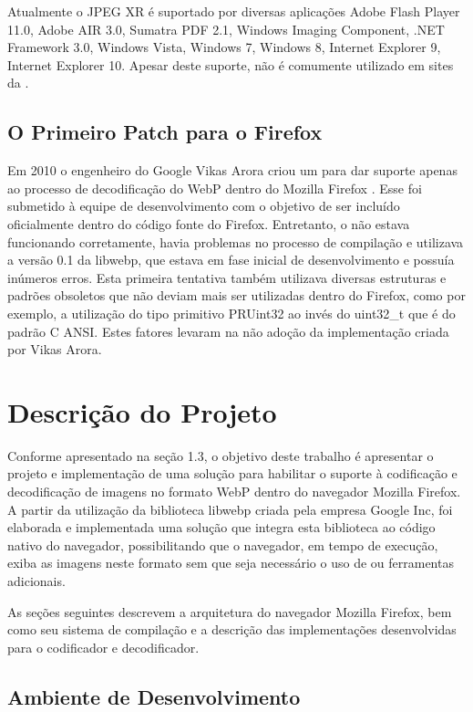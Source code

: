 \documentclass[espaco=simples,appendix=Name]{abnt}
\begin{document}
Atualmente o JPEG XR é suportado por diversas aplicações Adobe Flash Player 11.0, Adobe AIR 3.0, Sumatra PDF 2.1, Windows Imaging Component, .NET Framework 3.0, Windows Vista, Windows 7, Windows 8, Internet Explorer 9, Internet Explorer 10. Apesar deste suporte, não é comumente utilizado em sites da . \cite{HDPhoto}

\section{O Primeiro Patch para o Firefox}

Em 2010 o engenheiro do Google Vikas Arora criou um  para dar suporte apenas ao processo de decodificação do WebP dentro do Mozilla Firefox \cite{FirefoxBug}. Esse  foi submetido à equipe de desenvolvimento com o objetivo de ser incluído oficialmente dentro do código fonte do Firefox. Entretanto, o  não estava funcionando corretamente, havia problemas no processo de compilação e utilizava a versão 0.1 da libwebp, que estava em fase inicial de desenvolvimento e possuía inúmeros erros. Esta primeira tentativa também utilizava diversas estruturas e padrões obsoletos que não deviam mais ser utilizadas dentro do Firefox, como por exemplo, a utilização do tipo primitivo PRUint32 ao invés do uint32\_t que é do padrão C ANSI. Estes fatores levaram na não adoção da implementação criada por Vikas Arora.

\chapter{Descrição do Projeto}

Conforme apresentado na seção 1.3, o objetivo deste trabalho é apresentar o projeto e implementação de uma solução para habilitar o suporte à codificação e decodificação de imagens no formato WebP dentro do navegador Mozilla Firefox. A partir da utilização da biblioteca libwebp criada pela empresa Google Inc, foi elaborada e implementada uma solução que integra esta biblioteca ao código nativo do navegador, possibilitando que o navegador, em tempo de execução, exiba as imagens neste formato sem que seja necessário o uso de  ou ferramentas adicionais.

As seções seguintes descrevem a arquitetura do navegador Mozilla Firefox, bem como seu sistema de compilação e a descrição das implementações desenvolvidas para o codificador e decodificador.

\section{Ambiente de Desenvolvimento}
\end{document}
